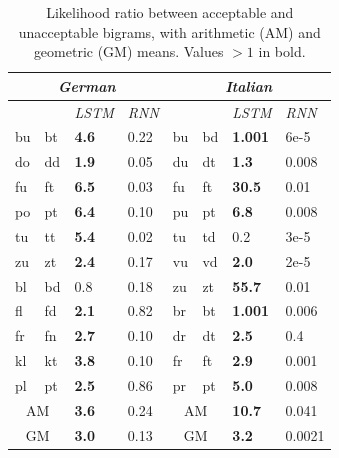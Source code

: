 \begin{table}[t]
  \begin{center}
	  \begin{tabular}{p{0.2cm}p{0.2cm}|p{0.6cm}p{0.6cm}||p{0.2cm}p{0.2cm}|p{0.99cm}p{0.8cm}}
	    \multicolumn{4}{c||}{\emph{German}}   &       \multicolumn{4}{c}{\emph{Italian}}\\      \hline
	    \multicolumn{2}{c}{\emph{}}&\emph{LSTM}&\emph{RNN} & \multicolumn{2}{c}{\emph{}}&  \emph{LSTM}&\emph{RNN}\\      \hline
                     bu &  bt &  \textbf{ 4.6} &  0.22             &  bu & bd & \textbf{ 1.001} & 6e-5 \\            
                     do &  dd &  \textbf{ 1.9} &  0.05             &  du & dt & \textbf{ 1.3} & 0.008 \\             
                     fu &  ft &  \textbf{ 6.5} &  0.03             &  fu & ft & \textbf{ 30.5} & 0.01 \\             
                     po &  pt &  \textbf{ 6.4} &  0.10             &  pu & pt & \textbf{ 6.8} & 0.008 \\             
                     tu &  tt &  \textbf{ 5.4} &  0.02             &  tu & td &  0.2 & 3e-5 \\                       
		     zu &  zt &  \textbf{ 2.4} &  0.17             &  vu & vd & \textbf{ 2.0} & 2e-5 \\              \cline{1-4}
                     bl &  bd &   0.8          & 0.18              &  zu & zt & \textbf{ 55.7} & 0.01 \\              \cline{5-8} 
                     fl &  fd &  \textbf{ 2.1} & 0.82              &  br & bt & \textbf{ 1.001}  &  0.006           \\ 
                     fr &  fn &  \textbf{ 2.7} & 0.10              &  dr & dt & \textbf{ 2.5} & 0.4 \\               
                     kl &  kt &  \textbf{ 3.8} & 0.10              &  fr & ft & \textbf{ 2.9} & 0.001 \\             
                     pl &  pt &  \textbf{ 2.5} & 0.86              &  pr & pt & \textbf{ 5.0} & 0.008 \\              \hline
	    \multicolumn{2}{c|}{AM}      & \textbf{3.6} & 0.24     & 	    \multicolumn{2}{c|}{AM}   & \textbf{10.7}  & 0.041          \\
	    \multicolumn{2}{c|}{GM} & \textbf{3.0} & 0.13          & 	    \multicolumn{2}{c|}{GM}   & \textbf{3.2} & 0.0021           \\
      \hline
    \end{tabular}
  \end{center}
	\caption{\label{tab:phonotactics-results} Likelihood ratio between acceptable and unacceptable bigrams, with arithmetic (AM) and geometric (GM) means. Values $>1$ in bold.}
\end{table}
